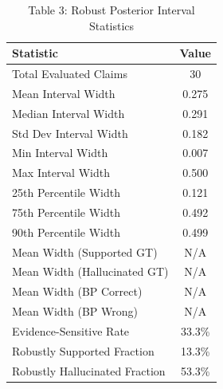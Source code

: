 \begin{table}[htbp]
\centering
\caption{Table 3: Robust Posterior Interval Statistics}
\label{tab:table3_interval_statistics}
\begin{tabular}{lc}
\hline
Statistic & Value \\
\hline
Total Evaluated Claims & 30 \\
Mean Interval Width & 0.275 \\
Median Interval Width & 0.291 \\
Std Dev Interval Width & 0.182 \\
Min Interval Width & 0.007 \\
Max Interval Width & 0.500 \\
25th Percentile Width & 0.121 \\
75th Percentile Width & 0.492 \\
90th Percentile Width & 0.499 \\
Mean Width (Supported GT) & N/A \\
Mean Width (Hallucinated GT) & N/A \\
Mean Width (BP Correct) & N/A \\
Mean Width (BP Wrong) & N/A \\
Evidence-Sensitive Rate & 33.3\% \\
Robustly Supported Fraction & 13.3\% \\
Robustly Hallucinated Fraction & 53.3\% \\
\hline
\end{tabular}
\end{table}